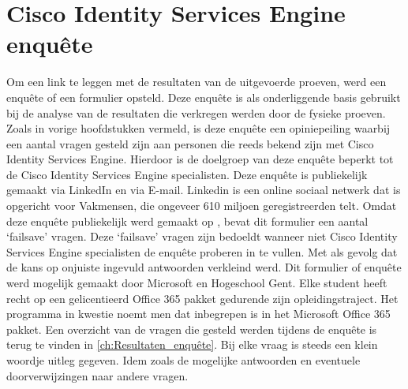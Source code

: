 \section{Cisco Identity Services Engine enquête}
\label{sec:enquête}
Om een link te leggen met de resultaten van de uitgevoerde proeven, werd een enquête of een formulier opsteld. Deze enquête is als onderliggende basis gebruikt bij de analyse van de resultaten die verkregen werden door de fysieke proeven. Zoals in vorige hoofdstukken vermeld, is deze enquête een opiniepeiling waarbij een aantal vragen gesteld zijn aan personen die reeds bekend zijn met Cisco Identity Services Engine. Hierdoor is de doelgroep van deze enquête beperkt tot de Cisco Identity Services Engine specialisten.
\newline
\newline
Deze enquête is publiekelijk gemaakt via LinkedIn en via E-mail. Linkedin is een online sociaal netwerk dat is opgericht voor Vakmensen, die ongeveer 610 miljoen geregistreerden telt. Omdat deze enquête publiekelijk werd gemaakt op \cite{LinkedIn}, bevat dit formulier een aantal ‘failsave’ vragen. Deze ‘failsave’ vragen zijn bedoeldt wanneer niet Cisco Identity Services Engine specialisten de enquête proberen in te vullen. Met als gevolg dat de kans op onjuiste ingevuld antwoorden verkleind werd.
\newline
\newline
Dit formulier of enquête werd mogelijk gemaakt door Microsoft en Hogeschool Gent. Elke student heeft recht op een gelicentieerd Office 365 pakket gedurende zijn opleidingstraject. Het programma in kwestie noemt men \cite{MicrosoftForms} dat inbegrepen is in het Microsoft Office 365 pakket.
\newline
\newline
Een overzicht van de vragen die gesteld werden tijdens de enquête is terug te vinden in \ref{ch:Resultaten_enquête}. Bij elke vraag is steeds een klein woordje uitleg gegeven. Idem zoals de mogelijke antwoorden en eventuele doorverwijzingen naar andere vragen.


